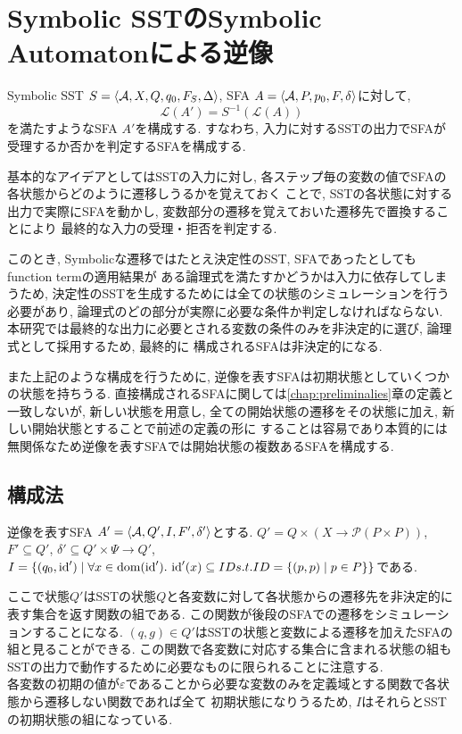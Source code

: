 \documentclass[uplatex,dvipdfmx,a4j]{jsreport}
\begin{document}
  \chapter{Symbolic SSTのSymbolic Automatonによる逆像}  \label{chap:symbolic_preimage}

  Symbolic SST $S = {\langle {\mathcal{A}, X, Q, q_0, F_S, \Delta} \rangle}$,
  SFA $A = {\langle {\mathcal{A}, P, p_0, F, \delta} \rangle}$に対して,
  \[
    \mathcal{L}(A') = S^{-1}(\mathcal{L}(A))
  \]
  を満たすようなSFA $A'$を構成する.
  すなわち, 入力に対するSSTの出力でSFAが受理するか否かを判定するSFAを構成する.

  基本的なアイデアとしてはSSTの入力に対し, 各ステップ毎の変数の値でSFAの各状態からどのように遷移しうるかを覚えておく
  ことで, SSTの各状態に対する出力で実際にSFAを動かし, 変数部分の遷移を覚えておいた遷移先で置換することにより
  最終的な入力の受理・拒否を判定する.

  このとき, Symbolicな遷移ではたとえ決定性のSST, SFAであったとしてもfunction termの適用結果が
  ある論理式を満たすかどうかは入力に依存してしまうため, 決定性のSSTを生成するためには全ての状態のシミュレーションを行う
  必要があり, 論理式のどの部分が実際に必要な条件か判定しなければならない.
  本研究では最終的な出力に必要とされる変数の条件のみを非決定的に選び, 論理式として採用するため, 最終的に
  構成されるSFAは非決定的になる.

  また上記のような構成を行うために, 逆像を表すSFAは初期状態としていくつかの状態を持ちうる.
  直接構成されるSFAに関しては\ref{chap:preliminalies}章の定義と一致しないが,
  新しい状態を用意し, 全ての開始状態の遷移をその状態に加え, 新しい開始状態とすることで前述の定義の形に
  することは容易であり本質的には無関係なため逆像を表すSFAでは開始状態の複数あるSFAを構成する.

  \section{構成法}
  逆像を表すSFA $A' = {\langle {\mathcal{A}, Q', I, F', \delta'} \rangle}$とする.
  $Q' = Q \times (X \rightarrow \mathcal{P}(P \times P))$,
  $F' \subseteq Q'$, $\delta' \subseteq Q' \times \Psi \rightarrow Q'$,
  $I = \{ (q_0, \mbox{id}') \mid \forall x \in \mbox{dom}(\mbox{id}').\ \mbox{id}'(x) \subseteq ID
  s.t. ID = \{ (p, p) \mid p \in P \} \}$である.

  ここで状態$Q'$はSSTの状態$Q$と各変数に対して各状態からの遷移先を非決定的に表す集合を返す関数の組である.
  この関数が後段のSFAでの遷移をシミュレーションすることになる.
  $(q, g) \in Q'$はSSTの状態と変数による遷移を加えたSFAの組と見ることができる.
  この関数で各変数に対応する集合に含まれる状態の組もSSTの出力で動作するために必要なものに限られることに注意する. \\
  各変数の初期の値が$\varepsilon$であることから必要な変数のみを定義域とする関数で各状態から遷移しない関数であれば全て
  初期状態になりうるため, $I$はそれらとSSTの初期状態の組になっている.
\end{document}
